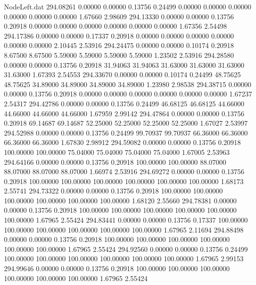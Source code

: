 \begin{filecontents}{NodeLeft.dat}
 294.08261    0.00000    0.00000     0.13756    0.24499    0.00000    0.00000    0.00000    0.00000    0.00000    0.00000    1.67660    2.98609
 294.13330    0.00000    0.00000     0.13756    0.20918    0.00000    0.00000    0.00000    0.00000    0.00000    0.00000    1.67356    2.54498
 294.17386    0.00000    0.00000     0.17337    0.20918    0.00000    0.00000    0.00000    0.00000    0.00000    0.00000    2.10445    2.53916
 294.24475    0.00000    0.00000     0.10174    0.20918    8.67500    8.67500    5.59000    5.59000    5.59000    5.59000    1.23502    2.53916
 294.28580    0.00000    0.00000     0.13756    0.20918   31.94063   31.94063   31.63000   31.63000   31.63000   31.63000    1.67393    2.54553
 294.33670    0.00000    0.00000     0.10174    0.24499   48.75625   48.75625   34.89000   34.89000   34.89000   34.89000    1.23980    2.98538
 294.38715    0.00000    0.00000     0.13756    0.20918    0.00000    0.00000    0.00000    0.00000    0.00000    0.00000    1.67237    2.54317
 294.42786    0.00000    0.00000     0.13756    0.24499   46.68125   46.68125   44.66000   44.66000   44.66000   44.66000    1.67959    2.99142
 294.47864    0.00000    0.00000     0.13756    0.20918   69.14687   69.14687   52.25000   52.25000   52.25000   52.25000    1.67027    2.53997
 294.52988    0.00000    0.00000     0.13756    0.24499   99.70937   99.70937   66.36000   66.36000   66.36000   66.36000    1.67830    2.98912
 294.59082    0.00000    0.00000     0.13756    0.20918  100.00000  100.00000   75.04000   75.04000   75.04000   75.04000    1.67005    2.53963
 294.64166    0.00000    0.00000     0.13756    0.20918  100.00000  100.00000   88.07000   88.07000   88.07000   88.07000    1.66974    2.53916
 294.69272    0.00000    0.00000     0.13756    0.20918  100.00000  100.00000  100.00000  100.00000  100.00000  100.00000    1.68173    2.55741
 294.73322    0.00000    0.00000     0.13756    0.20918  100.00000  100.00000  100.00000  100.00000  100.00000  100.00000    1.68120    2.55660
 294.78381    0.00000    0.00000     0.13756    0.20918  100.00000  100.00000  100.00000  100.00000  100.00000  100.00000    1.67965    2.55424
 294.83441    0.00000    0.00000     0.13756    0.17337  100.00000  100.00000  100.00000  100.00000  100.00000  100.00000    1.67965    2.11694
 294.88498    0.00000    0.00000     0.13756    0.20918  100.00000  100.00000  100.00000  100.00000  100.00000  100.00000    1.67965    2.55424
 294.92560    0.00000    0.00000     0.13756    0.24499  100.00000  100.00000  100.00000  100.00000  100.00000  100.00000    1.67965    2.99153
 294.99646    0.00000    0.00000     0.13756    0.20918  100.00000  100.00000  100.00000  100.00000  100.00000  100.00000    1.67965    2.55424

\end{filecontents}
